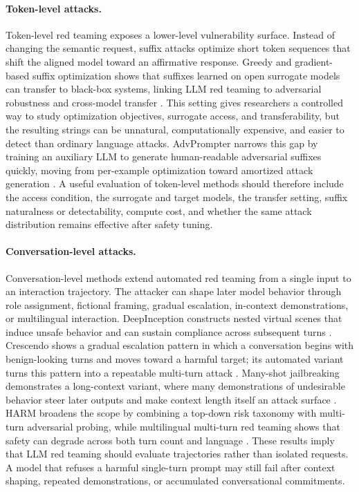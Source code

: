 \paragraph{Token-level attacks.}
Token-level red teaming exposes a lower-level vulnerability surface. Instead of changing the semantic request, suffix attacks optimize short token sequences that shift the aligned model toward an affirmative response. Greedy and gradient-based suffix optimization shows that suffixes learned on open surrogate models can transfer to black-box systems, linking LLM red teaming to adversarial robustness and cross-model transfer \cite{zou2023universal}. This setting gives researchers a controlled way to study optimization objectives, surrogate access, and transferability, but the resulting strings can be unnatural, computationally expensive, and easier to detect than ordinary language attacks. AdvPrompter narrows this gap by training an auxiliary LLM to generate human-readable adversarial suffixes quickly, moving from per-example optimization toward amortized attack generation \cite{paulus2024advprompter}. A useful evaluation of token-level methods should therefore include the access condition, the surrogate and target models, the transfer setting, suffix naturalness or detectability, compute cost, and whether the same attack distribution remains effective after safety tuning.

\paragraph{Conversation-level attacks.}
Conversation-level methods extend automated red teaming from a single input to an interaction trajectory. The attacker can shape later model behavior through role assignment, fictional framing, gradual escalation, in-context demonstrations, or multilingual interaction. DeepInception constructs nested virtual scenes that induce unsafe behavior and can sustain compliance across subsequent turns \cite{li2023deepinception}. Crescendo shows a gradual escalation pattern in which a conversation begins with benign-looking turns and moves toward a harmful target; its automated variant turns this pattern into a repeatable multi-turn attack \cite{russinovich2024crescendo}. Many-shot jailbreaking demonstrates a long-context variant, where many demonstrations of undesirable behavior steer later outputs and make context length itself an attack surface \cite{anil2024manyshot}. HARM broadens the scope by combining a top-down risk taxonomy with multi-turn adversarial probing, while multilingual multi-turn red teaming shows that safety can degrade across both turn count and language \cite{zhang-etal-2024-holistic,singhania-etal-2025-multi}. These results imply that LLM red teaming should evaluate trajectories rather than isolated requests. A model that refuses a harmful single-turn prompt may still fail after context shaping, repeated demonstrations, or accumulated conversational commitments.

